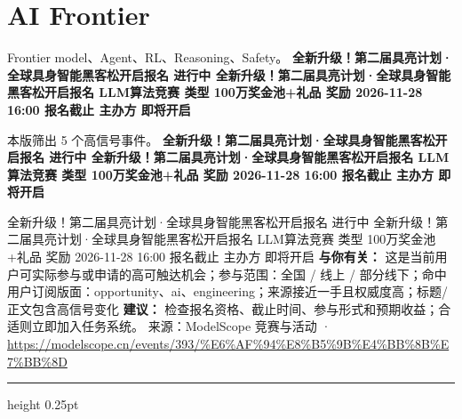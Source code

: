 \documentclass[10.5pt]{ctexart}
\begin{document}
\section*{AI Frontier}
{\color{ormuted} Frontier model、Agent、RL、Reasoning、Safety。}
\vspace{2mm}
{\LARGE\bfseries 全新升级！第二届具亮计划·全球具身智能黑客松开启报名 进行中 全新升级！第二届具亮计划·全球具身智能黑客松开启报名 LLM算法竞赛 类型 100万奖金池+礼品 奖励 2026-11-28 16:00 报名截止 主办方 即将开启}\par
\vspace{1mm}
{\color{ormuted} 本版筛出 5 个高信号事件。}
\vspace{3mm}
{\Large\bfseries 全新升级！第二届具亮计划·全球具身智能黑客松开启报名 进行中 全新升级！第二届具亮计划·全球具身智能黑客松开启报名 LLM算法竞赛 类型 100万奖金池+礼品 奖励 2026-11-28 16:00 报名截止 主办方 即将开启}\par
全新升级！第二届具亮计划·全球具身智能黑客松开启报名 进行中 全新升级！第二届具亮计划·全球具身智能黑客松开启报名 LLM算法竞赛 类型 100万奖金池+礼品 奖励 2026-11-28 16:00 报名截止 主办方 即将开启
\textbf{与你有关：} 这是当前用户可实际参与或申请的高可触达机会；参与范围：全国 / 线上 / 部分线下；命中用户订阅版面：opportunity、ai、engineering；来源接近一手且权威度高；标题/正文包含高信号变化
\textbf{建议：} 检查报名资格、截止时间、参与形式和预期收益；合适则立即加入任务系统。
{\footnotesize\color{ormuted} 来源：ModelScope 竞赛与活动 · \url{https://modelscope.cn/events/393/%E6%AF%94%E8%B5%9B%E4%BB%8B%E7%BB%8D}}
\vspace{4mm}
\hrule height 0.25pt
\vspace{3mm}
\end{document}
